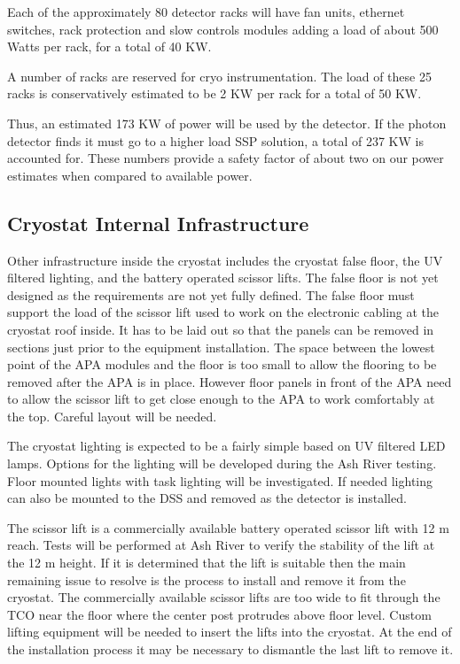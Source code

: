 Each of the approximately 80 detector racks will have fan units, ethernet switches, rack protection and slow controls modules adding a load of about 500 Watts per rack, for a total of 40 KW.

A number of racks are reserved for cryo instrumentation.  The load of these 25 racks is conservatively estimated to be 2 KW per rack for a total of 50 KW.

Thus, an estimated 173 KW of power will be used by the detector.  If the photon detector finds it must go to a higher load SSP solution, a total of 237 KW is accounted for.  These numbers provide a safety factor of about two on our power estimates when compared to available power.


\subsection{Cryostat Internal Infrastructure}
\label{sec:fdsp-tc-infr-cryo-int}




Other infrastructure inside the cryostat includes the cryostat false floor, the UV filtered lighting, and the battery operated scissor lifts. The false floor is not yet designed as the requirements are not yet fully defined. The false floor must support the load of the scissor lift used to work on the electronic cabling at the cryostat roof inside. It has to be laid out so that the panels can be removed in sections just prior to the equipment installation. The space between the lowest point of the APA modules and the floor is too small to allow the flooring to be removed after the APA is in place. However floor panels in front of the APA need to allow the scissor lift to get close enough to the APA to work comfortably at the top. Careful layout will be needed. 

The cryostat lighting is expected to be a fairly simple based on UV filtered LED lamps. Options for the lighting will be developed during the Ash River testing. Floor mounted lights with task lighting will be investigated. If needed lighting can also be mounted to the DSS and removed as the detector is installed.

The scissor lift is a commercially available battery operated scissor lift with 12 \si{m} reach. Tests will be performed at Ash River to verify the stability of the lift at the 12 \si{m} height. If it is determined that the lift is suitable then the main remaining issue to resolve is the process to install and remove it from the cryostat. The commercially available scissor lifts are too wide to fit through the TCO near the floor where the center post protrudes above floor level. Custom lifting equipment will be needed to insert the lifts into the cryostat. At the end of the installation process it may be necessary to dismantle the last lift to remove it.

